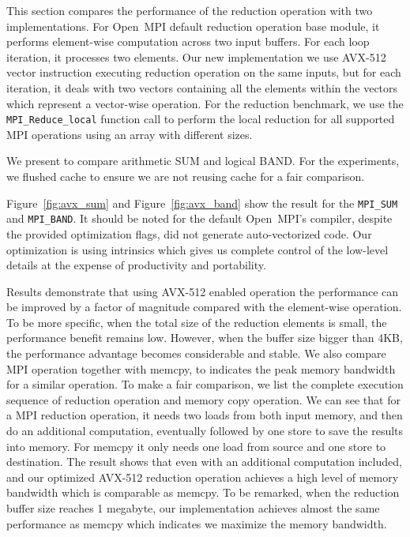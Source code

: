 \documentclass[sigconf]{acmart}
\newcommand{\mpifunc}[1]{\lstinline"MPI_#1"\xspace}
\newcommand{\ompi}[0]{Open~MPI\xspace}
\newcommand{\mpi}[0]{\textsc{MPI}\xspace}
\begin{document}
This section compares the performance of the reduction operation with two
implementations.
For \ompi default reduction operation base module, it
performs element-wise computation across two input buffers. For each loop iteration,
it processes two elements. Our new implementation we use AVX-512 vector instruction
executing reduction operation on the same inputs, but for each iteration, it
deals with two vectors containing all the elements within the vectors which represent
a vector-wise operation.
For the reduction benchmark, we use the \mpifunc{Reduce_local} function call to
perform the local reduction for all supported MPI operations using an array with different sizes.

We present to compare arithmetic SUM and logical BAND.
For the experiments, we flushed cache to ensure we are not reusing cache for a fair comparison.

Figure~\ref{fig:avx_sum} and Figure~\ref{fig:avx_band} show the result for the
\mpifunc{SUM} and \mpifunc{BAND}.
It should be noted for the default \ompi's compiler, despite the
provided optimization flags, did not generate auto-vectorized
code. Our optimization is using intrinsics which gives us complete
control of the low-level details at the expense of productivity and
portability.

Results demonstrate that using AVX-512 enabled operation the
performance can be improved by a factor of magnitude compared with the
element-wise operation.  To be more specific, when the total size of
the reduction elements is small, the performance benefit remains low.
%
However, when the buffer size bigger than 4KB, the performance
advantage becomes considerable and stable.  We also compare MPI
operation together with memcpy, to indicates the peak memory bandwidth
for a similar operation.  To make a fair comparison, we list the
complete execution sequence of reduction operation and memory copy
operation.  We can see that for a \mpi reduction operation, it needs
two loads from both input memory, and then do an additional
computation, eventually followed by one store to save the results into
memory. For memcpy it only needs one load from source and one store to
destination.  The result shows that even with an additional
computation included, and our optimized AVX-512 reduction operation
achieves a high level of memory bandwidth which is comparable as
memcpy.  To be remarked, when the reduction buffer size reaches 1
megabyte, our implementation achieves almost the same performance as
memcpy which indicates we maximize the memory bandwidth.
\end{document}
